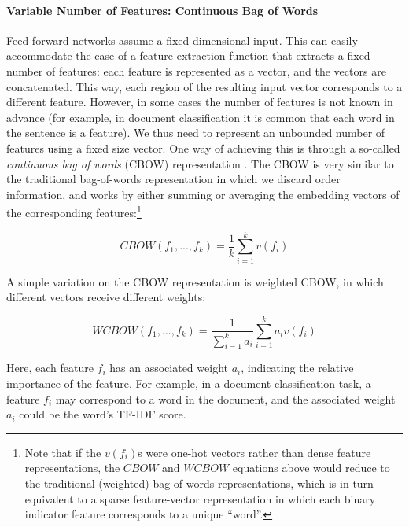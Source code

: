 \documentclass[jair,twoside,11pt,theapa]{article}
\begin{document}
{\paragraph{Variable Number of Features: Continuous Bag of Words}
Feed-forward networks assume a fixed dimensional input.
This can easily accommodate the case of a feature-extraction function that extracts a fixed
number of features: each feature is represented as a vector, and the vectors are
concatenated. This way, each region of the resulting input vector corresponds to a
different feature. However, in some cases the number of features is not known in
advance (for example, in document classification it is common that each word in
the sentence is a feature). 
We thus need to represent an unbounded number of features using a fixed size
vector.
One way of achieving this is through a so-called \emph{continuous bag of words}
(CBOW) representation \cite{mikolov2013efficient}. The CBOW is very similar to the traditional bag-of-words
representation in which we discard order information, and works by either summing or
averaging the
embedding vectors of the corresponding features:\footnote{Note that if the
$v(f_i)$s were one-hot vectors rather than dense feature representations, the
$CBOW$ and $WCBOW$ equations above would reduce to the traditional (weighted) bag-of-words
representations, which is in turn equivalent to a sparse feature-vector
representation in which
each binary indicator feature corresponds to a unique ``word''.}

\[CBOW(f_1,...,f_k) = \frac{1}{k}\sum_{i=1}^{k} v(f_i) \] 

A simple variation on the CBOW representation is weighted CBOW, in which different vectors receive different weights:

\[WCBOW(f_1,...,f_k) = \frac{1}{\sum_{i=1}^{k}a_i}\sum_{i=1}^{k} a_i v(f_i) \]

Here, each feature $f_i$ has an associated weight $a_i$, indicating the relative
importance of the feature. For example, in a document classification task, a
feature $f_i$ may correspond to a word in the document, and the associated
weight $a_i$ could be the word's TF-IDF score.

}
\end{document}
